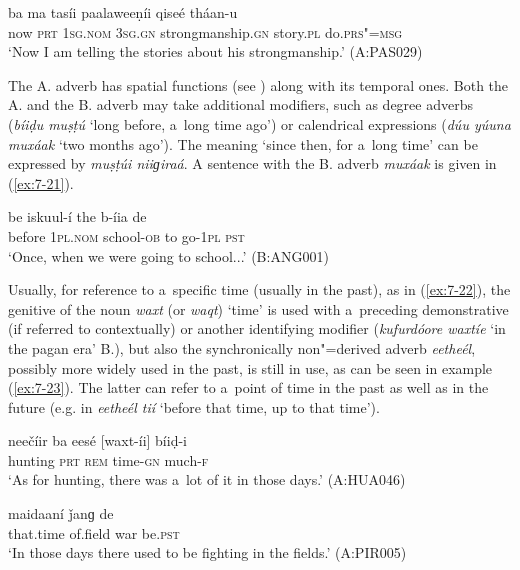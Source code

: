 \begin{exe}
\ex
\label{ex:7-20}
\gll [típa] ba ma tasíi paalaweeṇíi qiseé tháan-u \\
now \textsc{prt} \textsc{1sg.nom} \textsc{3sg.gn} strongmanship.\textsc{gn} story.\textsc{pl} do.\textsc{prs"=msg}\\
\glt `Now I am telling the stories about his strongmanship.' (A:PAS029)
\end{exe}

 The A. adverb has spatial functions (see ) along with its temporal ones. Both the A. and the B. adverb may take additional modifiers, such as degree adverbs (\textit{bíiḍu muṣṭú} `long before, a~long time ago') or calendrical expressions (\textit{dúu yúuna muxáak} `two months ago'). The meaning `since then, for a~long time' can be expressed by \textit{muṣṭúi niiɡiraá}. A sentence with the B. adverb \textit{muxáak} is given in (\ref{ex:7-21}).

\begin{exe}
\ex
\label{ex:7-21}
\gll [muxáak] be iskuul-í the b-íia de \\
before  \textsc{1pl.nom} school-\textsc{ob} to go-\textsc{1pl} \textsc{pst}\\
\glt `Once, when we were going to school...' (B:ANG001)
\end{exe}

 Usually, for reference to a~specific time (usually in the past), as in (\ref{ex:7-22}), the genitive of the noun \textit{waxt} (or \textit{waqt}) `time' is used with a~preceding demonstrative (if referred to contextually) or another identifying modifier (\textit{kufurdóore waxtíe} `in the pagan era' B.), but also the synchronically non"=derived adverb \textit{eetheél}, possibly more widely used in the past, is still in use, as can be seen in example (\ref{ex:7-23}). The latter can refer to a~point of time in the past as well as in the future (e.g. in \textit{eetheél tií} `before that time, up to that time').

\begin{exe}
\ex
\label{ex:7-22}
\gll neečíir ba eesé [waxt-íi] bíiḍ-i \\
hunting \textsc{prt} \textsc{rem} time-\textsc{gn}  much-\textsc{f} \\
\glt `As for hunting, there was a~lot of it in those days.' (A:HUA046)

\ex
\label{ex:7-23}
\gll [eetheél] maidaaní ǰanɡ de \\
that.time  of.field  war be.\textsc{pst } \\
\glt `In those days there used to be fighting in the fields.' (A:PIR005)
\end{exe}

